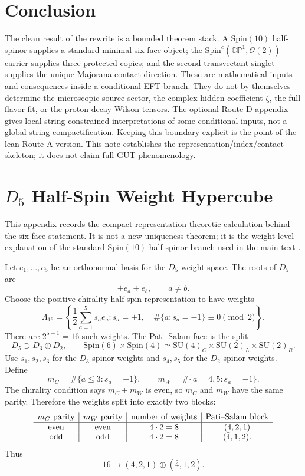 \documentclass[
  aps,
  prd,
  preprint,
  nofootinbib,
  superscriptaddress,
  longbibliography
]{revtex4-2}
\newcommand{\Spin}{\mathrm{Spin}}
\newcommand{\SU}{\mathrm{SU}}
\newcommand{\CP}{\mathbb{CP}}
\newcommand{\cO}{\mathcal{O}}
\begin{document}
\section{Conclusion}

The clean result of the rewrite is a bounded theorem stack.  A \(\Spin(10)\)
half-spinor supplies a standard minimal six-face object; the
\(\Spin^c(\CP^1,\cO(2))\) carrier supplies three protected copies; and the
second-transvectant singlet supplies the unique Majorana contact direction.
These are mathematical inputs and consequences inside a conditional EFT
branch.  They do not by themselves determine the microscopic source sector,
the complex hidden coefficient \(\zeta\), the full flavor fit, or the
proton-decay Wilson tensors.  The optional Route-D appendix gives local
string-constrained interpretations of some conditional inputs, not a global
string compactification.  Keeping this boundary explicit is the point of the
lean Route-A version.  This note establishes the
representation/index/contact skeleton; it does not claim full GUT
phenomenology.

\appendix
\section{\texorpdfstring{\(D_5\) Half-Spin Weight Hypercube}{D5 Half-Spin Weight Hypercube}}

This appendix records the compact representation-theoretic calculation behind
the six-face statement.  It is not a new uniqueness theorem; it is the
weight-level explanation of the standard \(\Spin(10)\) half-spinor branch used
in the main text \cite{Slansky1981,FultonHarris1991}.

Let \(e_1,\ldots,e_5\) be an orthonormal basis for the \(D_5\) weight space.
The roots of \(D_5\) are
\[
  \pm e_a\pm e_b,\qquad a\ne b.
\]
Choose the positive-chirality half-spin representation to have weights
\[
  \Lambda_{16}
  =
  \left\{
  \frac12\sum_{a=1}^5 s_a e_a:
  s_a=\pm1,\quad
  \#\{a:s_a=-1\}\equiv0\pmod2
  \right\}.
\]
There are \(2^{5-1}=16\) such weights.  The Pati--Salam face is the split
\[
  D_5\supset D_3\oplus D_2,
  \qquad
  \Spin(6)\times\Spin(4)
  \simeq
  \SU(4)_C\times\SU(2)_L\times\SU(2)_R.
\]
Use \(s_1,s_2,s_3\) for the \(D_3\) spinor weights and \(s_4,s_5\) for the
\(D_2\) spinor weights.  Define
\[
  m_C=\#\{a\le3:s_a=-1\},\qquad
  m_W=\#\{a=4,5:s_a=-1\}.
\]
The chirality condition says \(m_C+m_W\) is even, so \(m_C\) and \(m_W\) have
the same parity.  Therefore the weights split into exactly two blocks:
\[
\begin{array}{c|c|c|c}
m_C\ {\rm parity} & m_W\ {\rm parity} & \text{number of weights}
& \text{Pati--Salam block}\\
\hline
{\rm even} & {\rm even} & 4\cdot2=8 & (4,2,1)\\
{\rm odd} & {\rm odd} & 4\cdot2=8 & (\bar4,1,2).
\end{array}
\]
Thus
\[
  16\to (4,2,1)\oplus(\bar4,1,2).
\]
\end{document}
